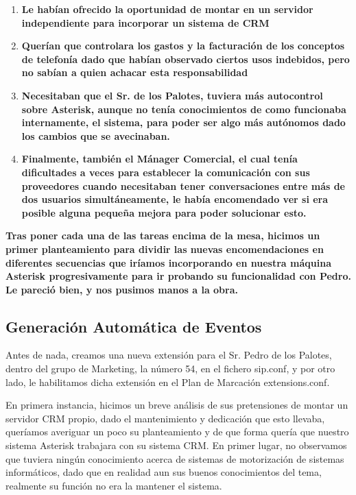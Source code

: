 \begin{enumerate}

\item \textbf{Le habían ofrecido la oportunidad de montar en un servidor independiente para incorporar un sistema de CRM}
\item \textbf{Querían que controlara los gastos y la facturación de los conceptos de telefonía dado que habían observado ciertos usos indebidos, pero no sabían a quien achacar esta responsabilidad}
\item \textbf{Necesitaban que el Sr. de los Palotes, tuviera más autocontrol sobre Asterisk, aunque no tenía conocimientos de como funcionaba internamente, el sistema, para poder ser algo más autónomos dado los cambios que se avecinaban.}
\item \textbf{Finalmente, también el Mánager Comercial, el cual tenía dificultades a veces para establecer la comunicación con sus proveedores cuando necesitaban tener conversaciones entre más de dos usuarios simultáneamente, le había encomendado ver si era posible alguna pequeña mejora para poder solucionar esto.}

\end{enumerate}

\textbf{Tras poner cada una de las tareas encima de la mesa, hicimos un primer planteamiento para dividir las nuevas encomendaciones en diferentes secuencias que iríamos incorporando en nuestra máquina Asterisk progresivamente para ir probando su funcionalidad con Pedro. Le pareció bien, y nos pusimos manos a la obra.}

\subsection{Generación Automática de Eventos}

Antes de nada, creamos una nueva extensión para el Sr. Pedro de los Palotes, dentro del grupo de Marketing, la número 54, en el fichero sip.conf, y por otro lado, le habilitamos dicha extensión en el Plan de Marcación extensions.conf.

En primera instancia, hicimos un breve análisis de sus pretensiones de montar un servidor CRM propio, dado el mantenimiento y dedicación que esto llevaba, queríamos averiguar un poco su planteamiento y de que forma quería que nuestro sistema Asterisk trabajara con su sistema CRM. En primer lugar, no observamos que tuviera ningún conocimiento acerca de sistemas de motorización de sistemas informáticos, dado que en realidad aun sus buenos conocimientos del tema, realmente su función no era la mantener el sistema. 

